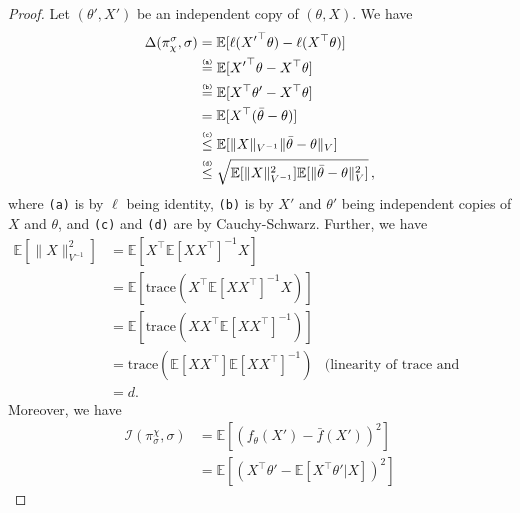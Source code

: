 \documentclass[letter, 12pt]{report}
\newcommand{\explan}[1]{\stackrel{\text{\tiny \texttt{#1}}}}
\newcommand{\E}{\mathbb E}
\newcommand{\I}{\mathcal{I}}
\newcommand{\1}{\mathbf{1}}
\theoremstyle{plain}
\theoremstyle{definition}
\theoremstyle{remark}
\begin{document}
\begin{proof}
    Let $(\theta', X')$ be an independent copy of $(\theta, X)$.
    We have
    \begin{align*}
        \Delta(\pi^\sigma_\chi, \sigma)
         & =
        \E[
            \ell({X'}^\top \theta) - \ell(X^\top \theta)
        ]    \\
         &
        \explan{(a)}
        =
        \E[
            {X'}^\top \theta - X^\top \theta
        ]    \\
         &
        \explan{(b)}
        =\E[
            X^\top \theta' - X^\top \theta
        ]    \\
         &
        =\E[
            X^\top (\bar{\theta} - \theta)
        ]    \\
         &
        \explan{(c)}
        \leq
        \E[
        \|X\|_{V^{-1}} \|\bar{\theta} - \theta\|_{V}
        ]
        \\
         &
        \explan{(d)}
        \leq
        \sqrt{
        \E[\|X\|^2_{V^{-1}}]
        \E[\|\bar{\theta} - \theta\|^2_{V}]
        }\,,
    \end{align*}
    where \texttt{(a)} is by $\ell$ being identity,
    \texttt{(b)} is by $X'$ and $\theta'$ being independent copies of $X$ and $\theta$,
    and \texttt{(c)} and \texttt{(d)} are by Cauchy-Schwarz.
    Further, we have
    \begin{align*}
        \E\left[\|X\|_{V^{-1}}^2\right]
                                                    & =
        \E\left[X^\top \E[XX^\top]^{-1} X\right]                                                  \\
                                                    & =
        \E\left[\text{trace}(X^\top \E[XX^\top]^{-1} X)\right]                                    \\
                                                    & =
        \E\left[\text{trace}(X X^\top \E[XX^\top]^{-1})\right]                                    \\
                                                    & =
        \text{trace}(\E[X X^\top] \E[XX^\top]^{-1}) & \text{(linearity of trace and expectation)} \\
                                                    & =d.
    \end{align*}
    Moreover, we have
    \begin{align*}
        \I(\pi_\sigma^\chi, \sigma)
         & =
        \E[(f_\theta(X') - \bar{f}(X'))^2]                                  \\
         & =
        \E[(X^\top \theta' - \E[X^\top \theta'|X])^2]

\end{align*}
\end{proof}
\end{document}
